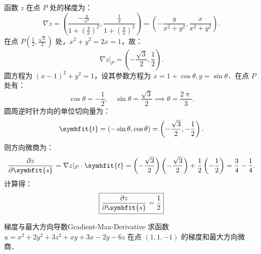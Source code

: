 \begin{solution}
    函数 $z$ 在点 $P$ 处的梯度为：
    \begin{equation}
        \nabla z = \left( \frac{-\frac{y}{x^2}}{1+(\frac{y}{x})^2}, \frac{\frac{1}{x}}{1+(\frac{y}{x})^2} \right) = \left( -\frac{y}{x^2+y^2}, \frac{x}{x^2+y^2} \right).
    \end{equation}
    在点 $P\left(\frac{1}{2}, \frac{\sqrt{3}}{2}\right)$ 处，$x^2+y^2 = 2x = 1$，故：
    \begin{equation}
        \nabla z|_{P} = \left( -\frac{\sqrt{3}}{2}, \frac{1}{2} \right).
    \end{equation}
    圆方程为 $(x-1)^2 + y^2 = 1$，设其参数方程为 $x = 1 + \cos \theta, y = \sin \theta$．在点 $P$ 处有：
    \begin{equation}
        \cos \theta = -\frac{1}{2}, \quad \sin \theta = \frac{\sqrt{3}}{2} \implies \theta = \frac{2\uppi}{3}.
    \end{equation}
    圆周逆时针方向的单位切向量为：
    \begin{equation}
        \symbfit{t} = (-\sin \theta, \cos \theta) = \left( -\frac{\sqrt{3}}{2}, -\frac{1}{2} \right).
    \end{equation}
    则方向微商为：
    \begin{equation}
        \frac{\partial z}{\partial \symbfit{s}} = \nabla z|_{P} \cdot \symbfit{t} = \left( -\frac{\sqrt{3}}{2} \right) \left( -\frac{\sqrt{3}}{2} \right) + \frac{1}{2} \left( -\frac{1}{2} \right) = \frac{3}{4} - \frac{1}{4}.
    \end{equation}
    计算得：
    \begin{equation}
        \boxed{\frac{\partial z}{\partial \symbfit{s}} = \frac{1}{2}}
    \end{equation}
\end{solution}


\begin{problem}{梯度与最大方向导数}{Gradient-Max-Derivative}
    求函数 $u = x^2 + 2y^2 + 3z^2 + xy + 3x - 2y - 6z$ 在点 $(1, 1, -1)$ 的梯度和最大方向微商．
\end{problem}

